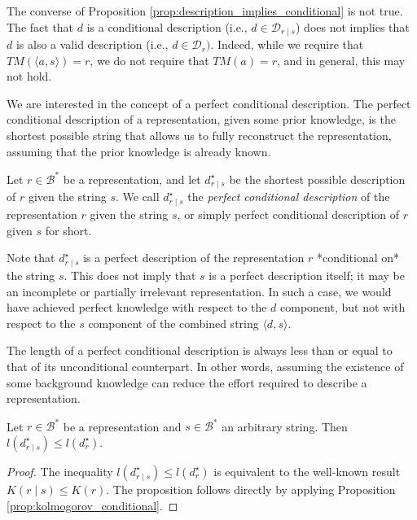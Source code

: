 The converse of Proposition \ref{prop:description_implies_conditional} is not true. The fact that $d$ is a conditional description (i.e., $d \in \mathcal{D}_{r \mid s}$) does not implies that $d$ is also a valid description (i.e., $d \in \mathcal{D}_{r})$. Indeed, while we require that $TM \left(\langle a, s \rangle \right) = r$, we do not require that $TM(a) = r$, and in general, this may not hold.

We are interested in the concept of a perfect conditional description. The perfect conditional description of a representation, given some prior knowledge, is the shortest possible string that allows us to fully reconstruct the representation, assuming that the prior knowledge is already known.

\begin{definition}
Let $r \in \mathcal{B}^\ast$ be a representation, and let $d^\star_{r \mid s}$ be the shortest possible description of $r$ given the string $s$. We call $d^\star_{r \mid s}$ the \emph{perfect conditional description} of the representation $r$ given the string $s$, or simply perfect conditional description of $r$ given $s$ for short.
\end{definition}

Note that $d^\star_{r \mid s}$ is a perfect description of the representation $r$ *conditional on* the string $s$. This does not imply that $s$ is a perfect description itself; it may be an incomplete or partially irrelevant representation. In such a case, we would have achieved perfect knowledge with respect to the $d$ component, but not with respect to the $s$ component of the combined string $\langle d, s \rangle$.

The length of a perfect conditional description is always less than or equal to that of its unconditional counterpart. In other words, assuming the existence of some background knowledge can reduce the effort required to describe a representation.

\begin{proposition}
\label{prop:description_conditional_inequality}
Let $r \in \mathcal{B}^\ast$ be a representation and $s \in \mathcal{B}^\ast$ an arbitrary string. Then $l \left( d^\star_{r \mid s} \right) \leq l \left( d^\star_r \right)$.
\end{proposition}
\begin{proof}
The inequality $l \left( d^\star_{r \mid s} \right) \leq l \left( d^\star_r \right)$ is equivalent to the well-known result $K(r \mid s) \leq K(r)$. The proposition follows directly by applying Proposition \ref{prop:kolmogorov_conditional}.
\end{proof}

